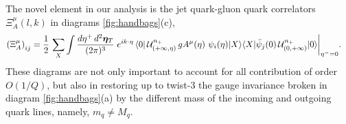 \documentclass[preprintnumbers,floatfix,nofootinbib]{revtex4}
\newcommand{\de}{d}                    %
\newcommand{\ii}{i}                    %
\newcommand{\mj}{M_q}
\begin{document}
The novel element in our analysis is the jet quark-gluon quark correlators
$\Xi_A^{\mu}(l,k)$ in diagrams \ref{fig:handbags}(c), 
\begin{equation} 
\begin{split} 
  \left(\Xi_A^{\mu} \right)_{ij} &=
   \frac{1}{2}\, \sum_X \int \frac{\de \eta^+\, \de^2 \bm{\eta}_T}{(2\pi)^{3}}\;
   e^{\ii k \cdot \eta}\,
   \langle 0|\,
   {\cal U}^{n_+}_{(+\infty,\eta)}\,
   g A^{\mu}(\eta)\,
   \,\psi_i(\eta)|X\rangle
   \langle X|
             \bar{\psi}_j(0)\,
   {\cal U}^{n_+}_{(0,+\infty)}
   |0\rangle \bigg|_{\eta^-=0} .
\label{e:xi_A}
\end{split} 
\end{equation}  
These diagrams are not only important to account for all contribution of order $O(1/Q)$, but also in restoring up to twist-3 the gauge invariance broken in diagram \ref{fig:handbags}(a) by the different mass of the incoming and outgoing quark lines, namely, $m_q \neq \mj$.
\end{document}
